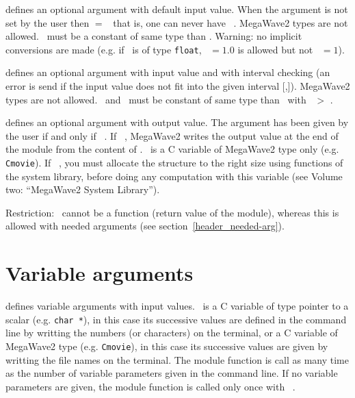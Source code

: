 \Liste{[\Tid\  = \Val] \Rarrow \Cid} 
defines an optional argument with default input value.
When the argument is not set by the user then \ACid $=$ \Val\ that is, one 
can never have \Cid\ \ENULL.
MegaWave2 types are not allowed.
\Val\ must be a constant of same type than \Cid.
Warning: no implicit conversions are made (e.g. if \Cid\ is of type \verb+float+, \Val\ $=1.0$ is allowed but not \Val\ $=1$).

\Liste{[\Tid\  = \Val\ ] \Rarrow \Cid\  [\Min,\Max]} 
defines an optional argument with input value and with interval checking 
(an error is send if the input value does not fit into the given interval [\Min,\Max]).
MegaWave2 types are not allowed.
\Min\ and \Max\ must be constant of same type than \Cid\ with \Max\ $>$ \Min.

\Liste{\Tid\  \Larrow \Cid}
defines an optional argument with output value.
The argument has been given by the user if and only if \Cid\ \DNULL.
If \Cid\ \DNULL, MegaWave2 writes the output value at the end of the module
from the content of \ACid.
\Cid\ is a C variable of MegaWave2 type only (e.g. \verb+Cmovie+).
If \Cid\ \DNULL, you must allocate the
structure to the right size using functions of the system library,
before doing any computation with this variable (see Volume two: ``MegaWave2 System Library'').

Restriction: \Cid\ cannot be a function (return value of the module), 
whereas this is allowed with needed arguments (see section~\ref{header_needed-arg}).


\section{Variable arguments}
\label{header_variable-arg}

\Liste{\ldots \Rarrow \Cid} 
defines variable arguments with input values.
\Cid\ is a C variable of type pointer to a scalar (e.g. \verb+char *+),
in this case its successive values are defined in the command line by writting the numbers (or characters) on the terminal,
or a C variable of MegaWave2 type (e.g. \verb+Cmovie+),
in this case its successive values are given by writting the file names on the terminal.
The module function is call as many time as the number of variable parameters given in the command line.
If no variable parameters are given, the module function is called only once
with  \Cid\ \ENULL.

